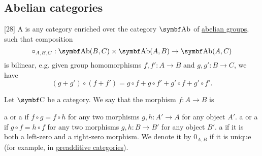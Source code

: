 \subsection{Abelian categories}\label{subsec:abelian_categories}

\begin{definition}\label{def:preadditive_category}\cite{MacLane1994}[28]
  A  is any category enriched over the category \( \Cat{Ab} \) of \hyperref[thm:ab_is_abelian]{abelian groups}, such that composition
  \begin{equation*}
    \circ_{A,B,C}: \Cat{Ab}(B, C) \times \Cat{Ab}(A, B) \to \Cat{Ab}(A, C)
  \end{equation*}
  is bilinear, e.g. given group homomorphisms \( f, f': A \to B \) and \( g, g': B \to C \), we have
  \begin{equation*}
    (g + g') \circ (f + f') = g \circ f + g \circ f' + g' \circ f + g' \circ f'.
  \end{equation*}
\end{definition}

\begin{definition}\label{def:zero_morphism}
  Let \( \Cat{C} \) be a category. We say that the morphism \( f: A \to B \) is
  \begin{defenum}
     a  or a  if \( f \circ g = f \circ h \) for any two morphisms \( g, h: A' \to A \) for any object \( A' \).
     a  or a  if \( g \circ f = h \circ f \) for any two morphisms \( g, h: B \to B' \) for any object \( B' \).
     a  if it is both a left-zero and a right-zero morphism. We denote it by \( 0_{A,B} \) if it is unique (for example, in \hyperref[def:preadditive_category]{preadditive categories}).
  \end{defenum}
\end{definition}

